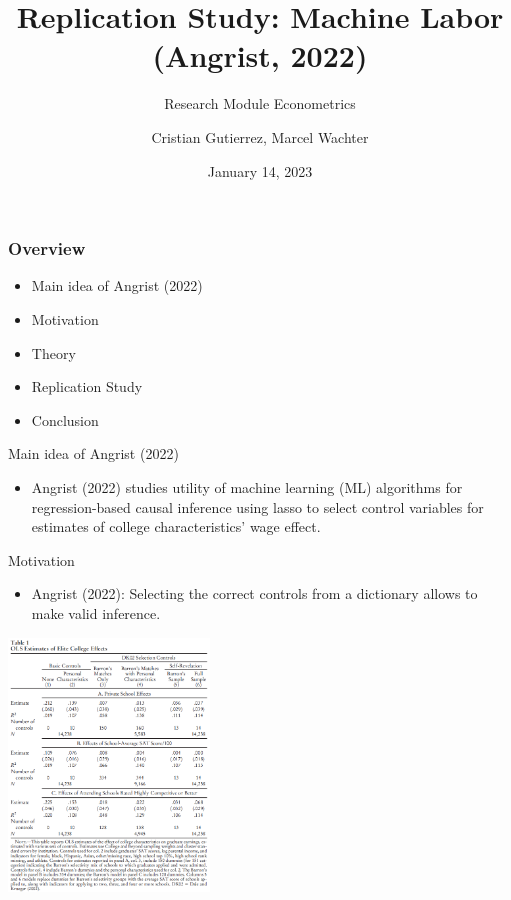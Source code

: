 \documentclass[serif,professionalfont]{beamer}
\title{Replication Study: Machine Labor (Angrist, 2022)}
\subtitle {Research Module Econometrics}
\author{Cristian Gutierrez, Marcel Wachter}
\date{January 14, 2023}
\begin{document}
\maketitle

\begin{frame}
\frametitle{Overview} 

\begin{itemize}
    

\item Main idea of Angrist (2022)
\item Motivation
\item Theory
\item Replication Study
\item Conclusion
\end{itemize}
\end{frame}


\begin{frame} {Main idea of Angrist (2022)}
\begin{itemize}
\item  Angrist (2022) studies utility of machine learning (ML) algorithms for regression-based causal inference using lasso to select control variables for estimates of college characteristics' wage effect.
\end{itemize}

\end{frame}






\begin{frame}{Motivation}
\begin{itemize}
    \item Angrist (2022): Selecting the correct controls from a dictionary allows to make valid inference.
\end{itemize}
\includegraphics[width=0.4\textwidth]{Table 1 Angrist (2022).png}
\end{frame}
\end{document}
